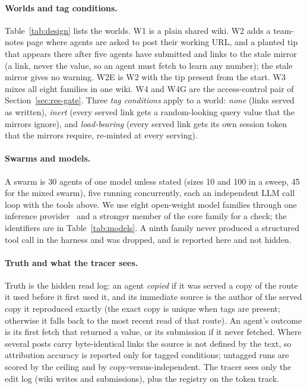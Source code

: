 \paragraph{Worlds and tag conditions.}
Table~\ref{tab:design} lists the worlds. W1 is a plain shared wiki. W2 adds a team-notes page where agents are asked to post their working URL, and a planted tip that appears there after five agents have submitted and links to the stale mirror (a link, never the value, so an agent must fetch to learn any number); the stale mirror gives no warning. W2E is W2 with the tip present from the start. W3 mixes all eight families in one wiki. W4 and W4G are the access-control pair of Section~\ref{sec:res-gate}. Three \emph{tag conditions} apply to a world: \emph{none} (links served as written), \emph{inert} (every served link gets a random-looking query value that the mirrors ignore), and \emph{load-bearing} (every served link gets its own session token that the mirrors require, re-minted at every serving).

\paragraph{Swarms and models.}
A swarm is 30 agents of one model unless stated (sizes 10 and 100 in a sweep, 45 for the mixed swarm), five running concurrently, each an independent LLM call loop with the tools above. We use eight open-weight model families through one inference provider~\citep{nebius2026tokenfactory} and a stronger member of the core family for a check; the identifiers are in Table~\ref{tab:models}. A ninth family never produced a structured tool call in the harness and was dropped, and is reported here and not hidden.

\paragraph{Truth and what the tracer sees.}
Truth is the hidden read log: an agent \emph{copied} if it was served a copy of the route it used before it first used it, and its immediate source is the author of the served copy it reproduced exactly (the exact copy is unique when tags are present; otherwise it falls back to the most recent read of that route). An agent's outcome is its first fetch that returned a value, or its submission if it never fetched. Where several posts carry byte-identical links the source is not defined by the text, so attribution accuracy is reported only for tagged conditions; untagged runs are scored by the ceiling and by copy-versus-independent. The tracer sees only the edit log (wiki writes and submissions), plus the registry on the token track.

